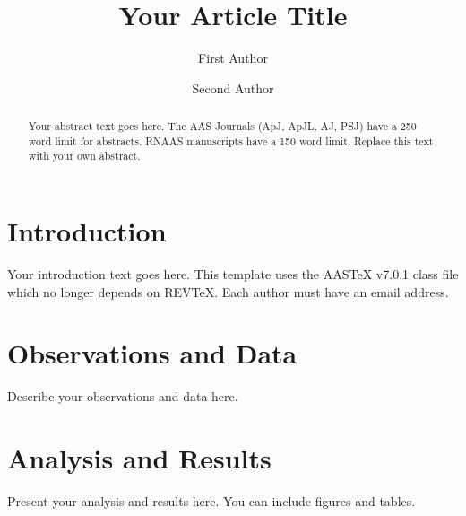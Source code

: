 \documentclass[linenumbers]{aastex701}
\begin{document}
\title{Your Article Title}

\author[orcid=0000-0000-0000-0001,sname=Author1]{First Author}

\author[orcid=0000-0000-0000-0002,sname=Author2]{Second Author}


\begin{abstract}
Your abstract text goes here. The AAS Journals (ApJ, ApJL, AJ, PSJ) have
a 250 word limit for abstracts. RNAAS manuscripts have a 150 word limit.
Replace this text with your own abstract.
\end{abstract}


\section{Introduction}

Your introduction text goes here. This template uses the AASTeX v7.0.1
class file which no longer depends on REVTeX. Each author must have an
email address.

\section{Observations and Data}

Describe your observations and data here.

\section{Analysis and Results}

Present your analysis and results here. You can include figures and tables.


\end{document}
